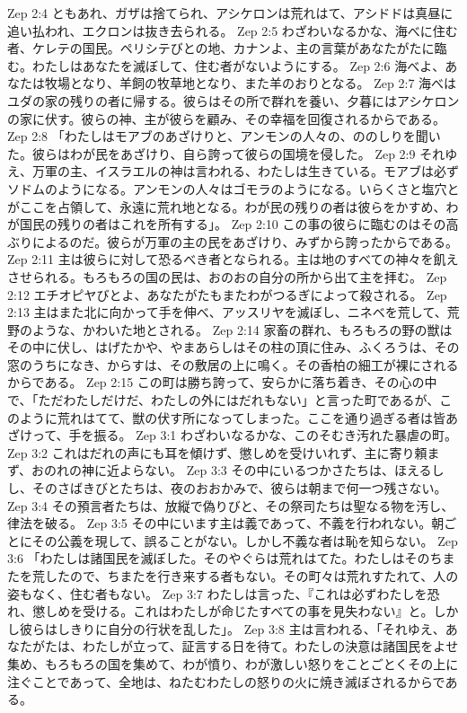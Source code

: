 Zep 2:4  ともあれ、ガザは捨てられ、アシケロンは荒れはて、アシドドは真昼に追い払われ、エクロンは抜き去られる。
Zep 2:5  わざわいなるかな、海べに住む者、ケレテの国民。ペリシテびとの地、カナンよ、主の言葉があなたがたに臨む。わたしはあなたを滅ぼして、住む者がないようにする。
Zep 2:6  海べよ、あなたは牧場となり、羊飼の牧草地となり、また羊のおりとなる。
Zep 2:7  海べはユダの家の残りの者に帰する。彼らはその所で群れを養い、夕暮にはアシケロンの家に伏す。彼らの神、主が彼らを顧み、その幸福を回復されるからである。
Zep 2:8  「わたしはモアブのあざけりと、アンモンの人々の、ののしりを聞いた。彼らはわが民をあざけり、自ら誇って彼らの国境を侵した。
Zep 2:9  それゆえ、万軍の主、イスラエルの神は言われる、わたしは生きている。モアブは必ずソドムのようになる。アンモンの人々はゴモラのようになる。いらくさと塩穴とがここを占領して、永遠に荒れ地となる。わが民の残りの者は彼らをかすめ、わが国民の残りの者はこれを所有する」。
Zep 2:10  この事の彼らに臨むのはその高ぶりによるのだ。彼らが万軍の主の民をあざけり、みずから誇ったからである。
Zep 2:11  主は彼らに対して恐るべき者となられる。主は地のすべての神々を飢えさせられる。もろもろの国の民は、おのおの自分の所から出て主を拝む。
Zep 2:12  エチオピヤびとよ、あなたがたもまたわがつるぎによって殺される。
Zep 2:13  主はまた北に向かって手を伸べ、アッスリヤを滅ぼし、ニネベを荒して、荒野のような、かわいた地とされる。
Zep 2:14  家畜の群れ、もろもろの野の獣はその中に伏し、はげたかや、やまあらしはその柱の頂に住み、ふくろうは、その窓のうちになき、からすは、その敷居の上に鳴く。その香柏の細工が裸にされるからである。
Zep 2:15  この町は勝ち誇って、安らかに落ち着き、その心の中で、「ただわたしだけだ、わたしの外にはだれもない」と言った町であるが、このように荒れはてて、獣の伏す所になってしまった。ここを通り過ぎる者は皆あざけって、手を振る。
Zep 3:1  わざわいなるかな、このそむき汚れた暴虐の町。
Zep 3:2  これはだれの声にも耳を傾けず、懲しめを受けいれず、主に寄り頼まず、おのれの神に近よらない。
Zep 3:3  その中にいるつかさたちは、ほえるしし、そのさばきびとたちは、夜のおおかみで、彼らは朝まで何一つ残さない。
Zep 3:4  その預言者たちは、放縦で偽りびと、その祭司たちは聖なる物を汚し、律法を破る。
Zep 3:5  その中にいます主は義であって、不義を行われない。朝ごとにその公義を現して、誤ることがない。しかし不義な者は恥を知らない。
Zep 3:6  「わたしは諸国民を滅ぼした。そのやぐらは荒れはてた。わたしはそのちまたを荒したので、ちまたを行き来する者もない。その町々は荒れすたれて、人の姿もなく、住む者もない。
Zep 3:7  わたしは言った、『これは必ずわたしを恐れ、懲しめを受ける。これはわたしが命じたすべての事を見失わない』と。しかし彼らはしきりに自分の行状を乱した」。
Zep 3:8  主は言われる、「それゆえ、あなたがたは、わたしが立って、証言する日を待て。わたしの決意は諸国民をよせ集め、もろもろの国を集めて、わが憤り、わが激しい怒りをことごとくその上に注ぐことであって、全地は、ねたむわたしの怒りの火に焼き滅ぼされるからである。
